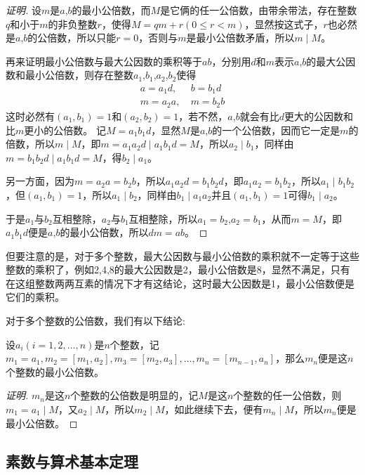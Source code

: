 \begin{proof}[证明]
  设$m$是$a$,$b$的最小公倍数，而$M$是它俩的任一公倍数，由带余带法，存在整数$q$和小于$m$的非负整数$r$，使得$M=qm+r(0 \leqslant r <m)$，显然按这式子，$r$也必然是$a$,$b$的公倍数，所以只能$r=0$，否则与$m$是最小公倍数矛盾，所以$m\mid M$。

  再来证明最小公倍数与最大公因数的乘积等于$ab$，分别用$d$和$m$表示$a$,$b$的最大公因数和最小公倍数，则存在整数$a_1$,$b_1$,$a_2$,$b_2$使得
  \begin{align*}
    a = a_1d, & \  b = b_1d \\
    m = a_2a, & \  m = b_2b
  \end{align*}
  这时必然有$(a_1,b_1)=1$和$(a_2,b_2)=1$，若不然，$a$,$b$就会有比$d$更大的公因数和比$m$更小的公倍数。
  记$M=a_1b_1d$，显然$M$是$a$,$b$的一个公倍数，因而它一定是$m$的倍数，所以$m \mid M$，即$m=a_1a_2d \mid a_1b_1d = M$，所以$a_2 \mid b_1$，同样由$m=b_1b_2d \mid a_1b_1d = M$，得$b_2 \mid a_1$。

  另一方面，因为$m=a_2a=b_2b$，所以$a_1a_2d=b_1b_2d$，即$a_1a_2=b_1b_2$，所以$a_1 \mid b_1b_2$，但$(a_1,b_1)=1$，所以$a_1 \mid b_2$，同样由$b_1 \mid a_1a_2$并且$(a_1,b_1)=1$可得$b_1 \mid a_2$。

  于是$a_1$与$b_2$互相整除，$a_2$与$b_1$互相整除，所以$a_1=b_2$,$a_2=b_1$，从而$m=M$，即$a_1b_1d$便是$a$,$b$的最小公倍数，所以$dm=ab$。
\end{proof}

但要注意的是，对于多个整数，最大公因数与最小公倍数的乘积就不一定等于这些整数的乘积了，例如2,4,8的最大公因数是2，最小公倍数是8，显然不满足，只有在这组整数两两互素的情况下才有这结论，这时最大公因数是1，最小公倍数便是它们的乘积。

对于多个整数的公倍数，我们有以下结论:
\begin{theorem}
  设$a_i(i=1,2,\ldots,n)$是$n$个整数，记$m_1=a_1, m_2=[m_1,a_2], m_3=[m_2,a_3],\ldots,m_n=[m_{n-1},a_n]$，那么$m_n$便是这$n$个整数的最小公倍数。
\end{theorem}

\begin{proof}[证明]
  $m_n$是这$n$个整数的公倍数是明显的，记$M$是这$n$个整数的任一公倍数，则$m_1 = a_1 \mid M$，又$a_2 \mid M$，所以$m_2 \mid M$，如此继续下去，便有$m_n \mid M$，所以$m_n$便是最小公倍数。
\end{proof}

\subsection{素数与算术基本定理}
\label{sec:prime-number-and-fundamental-theorem-of-arithmetic}

